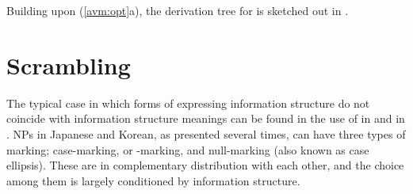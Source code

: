 \noindent Building upon (\ref{avm:opt}a), the derivation tree for
 is sketched out in
.




\section{Scrambling}
\label{10:sec:scrambling}


The typical case in which forms of expressing information structure do
not coincide with information structure meanings can be found in the
use of \wa in  and \nun in .
NPs in Japanese and Korean, as presented several times, can have three
types of marking; case-marking, \wa or \onun-marking, and null-marking
(also known as case ellipsis). These are in
complementary distribution with each other, and the choice among them
is largely conditioned by information structure.



